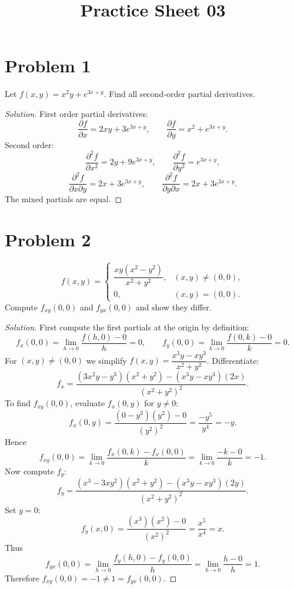 \documentclass{article}
\begin{document}
\title{Practice Sheet 03}
\author{}
\date{}
\maketitle

\section*{Problem 1}
Let \( f(x,y)=x^2y+e^{3x+y} \). Find all second‑order partial derivatives.

\begin{proof}[Solution]
	First order partial derivatives:
	\[
		\frac{\partial f}{\partial x}=2xy+3e^{3x+y},\qquad
		\frac{\partial f}{\partial y}=x^2+e^{3x+y}.
	\]
	Second order:
	\[
		\frac{\partial^2 f}{\partial x^2}=2y+9e^{3x+y},\qquad
		\frac{\partial^2 f}{\partial y^2}=e^{3x+y},
	\]
	\[
		\frac{\partial^2 f}{\partial x\partial y}=2x+3e^{3x+y},\qquad
		\frac{\partial^2 f}{\partial y\partial x}=2x+3e^{3x+y}.
	\]
	The mixed partials are equal.
\end{proof}

\section*{Problem 2}
\[
	f(x,y)=\begin{cases}
		\dfrac{xy(x^2-y^2)}{x^2+y^2}, & (x,y)\neq(0,0), \\[4pt]
		0,                            & (x,y)=(0,0).
	\end{cases}
\]
Compute \( f_{xy}(0,0) \) and \( f_{yx}(0,0) \) and show they differ.

\begin{proof}[Solution]
	First compute the first partials at the origin by definition:
	\[
		f_x(0,0)=\lim_{h\to0}\frac{f(h,0)-0}{h}=0,\qquad
		f_y(0,0)=\lim_{k\to0}\frac{f(0,k)-0}{k}=0.
	\]
	For \((x,y)\neq(0,0)\) we simplify \(f(x,y)=\dfrac{x^3y-xy^3}{x^2+y^2}\). Differentiate:
	\[
		f_x = \frac{(3x^2y-y^3)(x^2+y^2)-(x^3y-xy^3)(2x)}{(x^2+y^2)^2}.
	\]
	To find \(f_{xy}(0,0)\), evaluate \(f_x(0,y)\) for \(y\neq0\):
	\[
		f_x(0,y)=\frac{(0-y^3)(y^2)-0}{(y^2)^2}=\frac{-y^5}{y^4}=-y.
	\]
	Hence
	\[
		f_{xy}(0,0)=\lim_{k\to0}\frac{f_x(0,k)-f_x(0,0)}{k}=\lim_{k\to0}\frac{-k-0}{k}=-1.
	\]
	Now compute \(f_y\):
	\[
		f_y = \frac{(x^3-3xy^2)(x^2+y^2)-(x^3y-xy^3)(2y)}{(x^2+y^2)^2}.
	\]
	Set \(y=0\):
	\[
		f_y(x,0)=\frac{(x^3)(x^2)-0}{(x^2)^2}=\frac{x^5}{x^4}=x.
	\]
	Thus
	\[
		f_{yx}(0,0)=\lim_{h\to0}\frac{f_y(h,0)-f_y(0,0)}{h}=\lim_{h\to0}\frac{h-0}{h}=1.
	\]
	Therefore \(f_{xy}(0,0)=-1\neq1=f_{yx}(0,0)\).
\end{proof}
\end{document}
